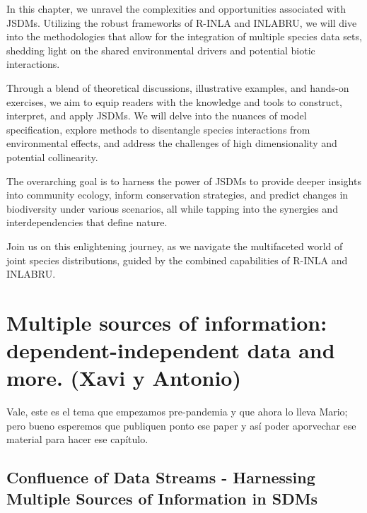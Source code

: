 \documentclass[
]{krantz}
\begin{document}
In this chapter, we unravel the complexities and opportunities associated with JSDMs. Utilizing the robust frameworks of R-INLA and INLABRU, we will dive into the methodologies that allow for the integration of multiple species data sets, shedding light on the shared environmental drivers and potential biotic interactions.

Through a blend of theoretical discussions, illustrative examples, and hands-on exercises, we aim to equip readers with the knowledge and tools to construct, interpret, and apply JSDMs. We will delve into the nuances of model specification, explore methods to disentangle species interactions from environmental effects, and address the challenges of high dimensionality and potential collinearity.

The overarching goal is to harness the power of JSDMs to provide deeper insights into community ecology, inform conservation strategies, and predict changes in biodiversity under various scenarios, all while tapping into the synergies and interdependencies that define nature.

Join us on this enlightening journey, as we navigate the multifaceted world of joint species distributions, guided by the combined capabilities of R-INLA and INLABRU.

\pagebreak
\setcounter{chapter}{13}
\setcounter{section}{0}
\renewcommand{\thepage}{\arabic{page}}

\hypertarget{multiple-sources-of-information-dependent-independent-data-and-more.-xavi-y-antonio}{%
\chapter{Multiple sources of information: dependent-independent data and more. (Xavi y Antonio)}\label{multiple-sources-of-information-dependent-independent-data-and-more.-xavi-y-antonio}}

Vale, este es el tema que empezamos pre-pandemia y que ahora lo lleva Mario; pero bueno esperemos que publiquen ponto ese paper y así poder aporvechar ese material para hacer ese capítulo.

\hypertarget{confluence-of-data-streams---harnessing-multiple-sources-of-information-in-sdms}{%
\section{Confluence of Data Streams - Harnessing Multiple Sources of Information in SDMs}\label{confluence-of-data-streams---harnessing-multiple-sources-of-information-in-sdms}}
\end{document}

